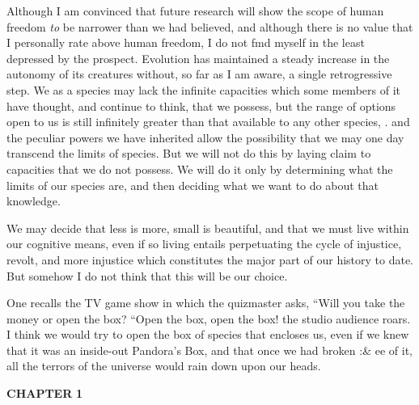 Although I am convinced that future research will show the scope of human freedom \textit{to} be narrower than we had believed, and although there is no value that I personally rate above human freedom, I do not fmd myself in the least depressed by the prospect. Evolution has maintained a steady increase in the autonomy of its creatures with\-out, so far as I am aware, a single retrogressive step. We as a species may lack the infinite capacities which some members of it have thought,
and continue to think, that we possess, but the range of options open to us is still infinitely greater than that available to any other species, . and the peculiar powers we have inherited allow the possibility that we may one day transcend the limits of species. But we will not do this by laying claim to capacities that we do not possess. We will do it only by determining what the limits of our species are, and then decid\-ing what we want to do about that knowledge.

We may decide that less is more, small is beautiful, and that we must live within our cognitive means, even if so living entails perpetu\-ating the cycle of injustice, revolt, and more injustice which constitutes the major part of our history to date. But somehow I do not think that this will be our choice.

One recalls the TV game show in which the quizmaster asks, ``Will you take the money or open the box?{\textquotedbl} ``Open the box, open the box! the studio audience roars. I think we would try to open the box of species that encloses us, even if we knew that it was an inside-out Pandora's Box, and that once we had broken :\& ee of it, all the terrors of the universe would rain down upon our heads.




\textbf{CHAPTER} \textbf{1}


